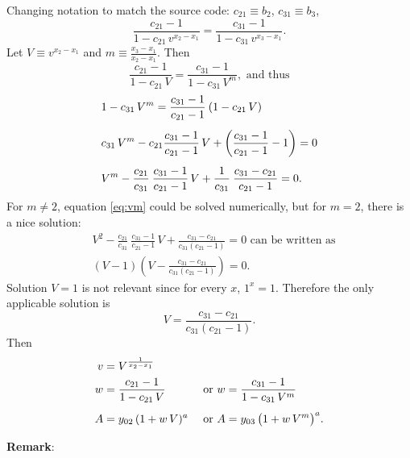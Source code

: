 \documentclass[12pt]{article}
\theoremstyle{remark}
\begin{document}
Changing notation to match the source code: $c_{21} \equiv b_2$, $c_{31}
\equiv b_3$,
\begin{equation}
  \frac{c_{21} - 1}{1 - c_{21} \, v^{x_2 - x_1}} =
  \frac{c_{31} - 1}{1 - c_{31} \, v^{x_3 - x_1}}.
\end{equation}
Let $V \equiv v^{x_2 - x_1}$ and $m \equiv \frac{x_3 - x_1}{x_2 -
  x_1}$. Then
\begin{equation}
  \frac{c_{21} - 1}{1 - c_{21} \, V} = \frac{c_{31} - 1}{1 - c_{31} \,
V^m}, \text{ and thus}
\end{equation}
\begin{align}
  &1 - c_{31} \, V^m = \frac{c_{31} - 1}{c_{21} - 1} \: (1 - c_{21} \,
    V)  \\[0.5em] 
  &c_{31} \, V^m - c_{21} \frac{c_{31} - 1}{c_{21} - 1} \, V +
    \left(\frac{c_{31} - 1}{c_{21} - 1} - 1\right) = 0 \notag \\[0.5em]
  &V^m - \frac{c_{21}}{c_{31}} \: \frac{c_{31} - 1}{c_{21} - 1} \, V +
    \frac{1}{c_{31}} \: \frac{c_{31} - c_{21}}{c_{21} - 1} = 0. \label{eq:vm}
\end{align}
For $m \neq 2$, equation \eqref{eq:vm} could be solved numerically,
but for $m = 2$, there is a nice solution:
\begin{align} \label{eq:V2}
  &V^2 - \frac{c_{21}}{c_{31}} \: \frac{c_{31} - 1}{c_{21} - 1} \, V +
    \frac{c_{31} - c_{21}}{c_{31}(c_{21} - 1)} = 0 \text{ can be
    written as} \\ 
  &(V - 1)\left(V - \frac{c_{31} - c_{21}}{c_{31}(c_{21} - 1)} \right)
    = 0.
\end{align}
Solution $V = 1$ is not relevant since for every $x$, $1^x =
1$. Therefore the only applicable solution is 
\begin{equation}
  V = \frac{c_{31} - c_{21}}{c_{31}(c_{21} - 1)}.
\end{equation}
Then
\begin{alignat}{2}
  v &= V^{\frac{1}{x_2 - x_1}} \notag && \\
    w &= \frac{c_{21} - 1}{1 - c_{21} \, V} &&\text{ or }
    w   = \frac{c_{31} - 1}{1 - c_{31} \, V^m} \notag \\[0.5em]
    A &= y_{02} \, (1 + w \, V)^a               &&\text{ or }
    A   = y_{03} \, \big(1 + w \, V^m\big)^a. 
\end{alignat}

\textbf{Remark}: \\
\end{document}
